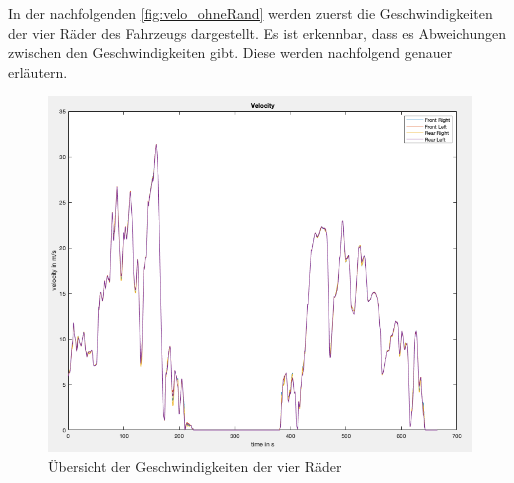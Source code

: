 	In der nachfolgenden \autoref{fig:velo_ohneRand} werden zuerst die Geschwindigkeiten der vier Räder des Fahrzeugs dargestellt. Es ist erkennbar, dass es Abweichungen zwischen den Geschwindigkeiten gibt. Diese werden nachfolgend genauer erläutern.
	\begin{figure}[h!]
		\centering
		\includegraphics[width=1\linewidth]{../Graphiken/velo_ohneRand}
		\caption{Übersicht der Geschwindigkeiten der vier Räder}
		\label{fig:velo_ohneRand}
	\end{figure}
\pagebreak


